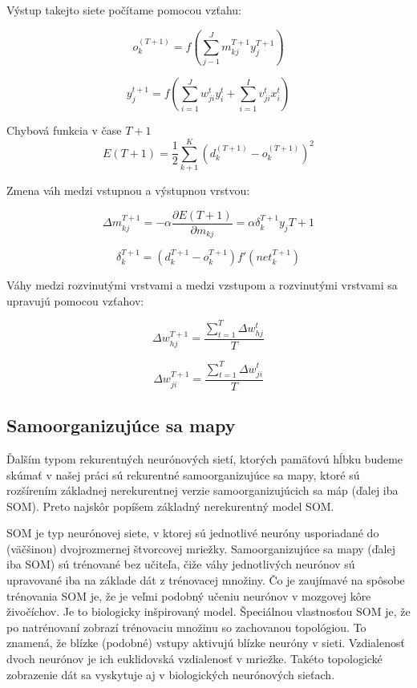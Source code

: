 Výstup takejto siete počítame pomocou vzťahu:

\begin{equation}
	o_{k}^(T+1) = f(\sum_{j-1}^{J}m_{kj}^{T+1}y_{j}^{T+1})
\end{equation}

\begin{equation}
	y_{j}^{t+1} = f (\sum_{i=1}^{J}w_{ji}^{t}y_{i}^{t} + \sum_{i=1}^{I}v_{ji}^{t}x_{i}^{t})
\end{equation}

Chybová funkcia  v čase $T + 1$
\begin{equation}
	E(T+1) = \frac{1}{2} \sum_{k+1}^{K}(d_{k}^(T+1) - o_{k}^(T+1))^{2}
\end{equation}

Zmena váh medzi vstupnou a výstupnou vrstvou:

\begin{equation}
	\Delta m_{kj}^{T+1} = -\alpha\frac{\partial E(T+1)}{\partial m_{kj}} = \alpha \delta_{k}^{T+1}y_{j}{T+1}
\end{equation}

\begin{equation}
	\delta_{k}^{T+1} = (d_{k}^{T+1} - o_{k}^{T+1})f'(net_{k}^{T+1})
\end{equation}

Váhy medzi rozvinutými vrstvami a medzi vzstupom a rozvinutými vrstvami sa upravujú pomocou vzťahov:

\begin{equation}
	\Delta w_{hj}^{T+1} = \frac{\sum_{t=1}^{T} \Delta w_{hj}^{t}}{T}
\end{equation}

\begin{equation}
	\Delta w_{ji}^{T+1} = \frac{\sum_{t=1}^{T} \Delta w_{ji}^{t}}{T}
\end{equation}



\subsection{Samoorganizujúce sa mapy}
Ďalším typom rekurentných neurónových sietí, ktorých pamäťovú hĺbku budeme 
skúmať v našej práci sú rekurentné samoorganizujúce sa mapy, 
ktoré sú rozšírením základnej nerekurentnej verzie samoorganizujúcich sa máp (ďalej iba SOM). 
Preto najskôr popíšem základný nerekurentný model SOM.

SOM je typ neurónovej siete, v ktorej sú jednotlivé neuróny usporiadané do (väčšinou) dvojrozmernej štvorcovej mriežky. Samoorganizujúce sa mapy (ďalej iba SOM) sú trénované bez učiteľa, čiže váhy jednotlivých neurónov sú upravované iba na základe dát z trénovacej množiny. 
Čo je zaujímavé na spôsobe trénovania SOM je, že je veľmi podobný učeniu neurónov v mozgovej kôre živočíchov. Je to biologicky inšpirovaný model.
Špeciálnou vlastnosťou SOM je, že po natrénovaní zobrazí trénovaciu množinu so zachovanou topológiou. To znamená, že blízke (podobné) vstupy aktivujú blízke neuróny v sieti. Vzdialenosť dvoch neurónov je ich euklidovská vzdialenosť v mriežke. Takéto topologické zobrazenie dát sa vyskytuje aj v biologických neurónových sieťach.

